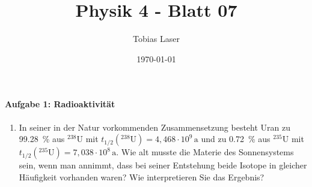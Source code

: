 \documentclass[11pt,a4paper]{scrartcl}
\begin{document}
    \title{Physik 4 - Blatt 07}
    \author{Tobias Laser}
    \date{\today}
    \maketitle
    \vfill
    \thispagestyle{empty}
    \newpage


    \paragraph{Aufgabe 1: Radioaktivität}

    \begin{enumerate}[label=(\alph*)]
        \item
            In seiner in der Natur vorkommenden Zusammensetzung besteht Uran zu
            \SI{99.28}{\percent} aus ${}^{238}\mathrm{U}$ mit
            $t_{1/2}({}^{238}\mathrm{U})=4{,}468\cdot 10^9\,\mathrm{a}$ und zu
            \SI{0.72}{\percent} aus ${}^{235}\mathrm{U}$ mit
            $t_{1/2}({}^{235}\mathrm{U})=7{,}038\cdot 10^8\,\mathrm{a}$.
            Wie alt musste die Materie des Sonnensystems sein, wenn man annimmt,
            dass bei seiner Entstehung beide Isotope in gleicher Häufigkeit vorhanden waren?
            Wie interpretieren Sie das Ergebnis?


\end{enumerate}
\end{document}

